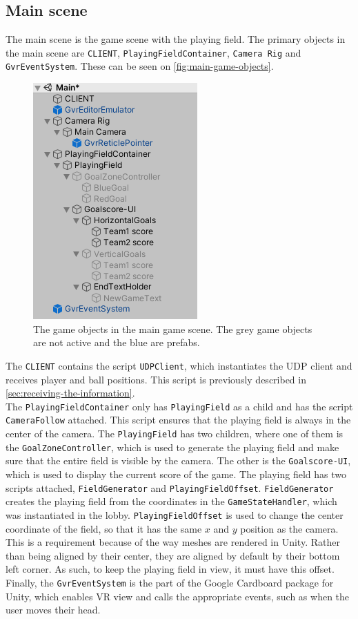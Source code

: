 \subsection{Main scene}
The main scene is the game scene with the playing field.
The primary objects in the main scene are \texttt{CLIENT}, \texttt{PlayingFieldContainer}, \texttt{Camera Rig} and \texttt{GvrEventSystem}.
These can be seen on \autoref{fig:main-game-objects}.\begin{figure}[H]
    \centering
    \includegraphics[width=0.4\linewidth]{figures/unity-main-gameobjects.PNG}
    \caption{The game objects in the main game scene. The grey game objects are not active and the blue are prefabs.}
    \label{fig:main-game-objects}
\end{figure}
\noindent
The \texttt{CLIENT} contains the script \texttt{UDPClient}, which instantiates the UDP client and receives player and ball positions.
This script is previously described in \autoref{sec:receiving-the-information}.
\\
The \texttt{PlayingFieldContainer} only has \texttt{PlayingField} as a child and has the script \texttt{CameraFollow} attached.
This script ensures that the playing field is always in the center of the camera.
The \texttt{PlayingField} has two children, where one of them is the \texttt{GoalZoneController}, which is used to generate the playing field and make sure that the entire field is visible by the camera.
The other is the \texttt{Goalscore-UI}, which is used to display the current score of the game.
The playing field has two scripts attached, \texttt{FieldGenerator} and \texttt{PlayingFieldOffset}.
\texttt{FieldGenerator} creates the playing field from the coordinates in the \texttt{GameStateHandler}, which was instantiated in the lobby.
\texttt{PlayingFieldOffset} is used to change the center coordinate of the field, so that it has the same $x$ and $y$ position as the camera.
This is a requirement because of the way meshes are rendered in Unity.
Rather than being aligned by their center, they are aligned by default by their bottom left corner.
As such, to keep the playing field in view, it must have this offset.
\\
Finally, the \texttt{GvrEventSystem} is the part of the Google Cardboard package for Unity, which enables VR view and calls the appropriate events, such as when the user moves their head.
